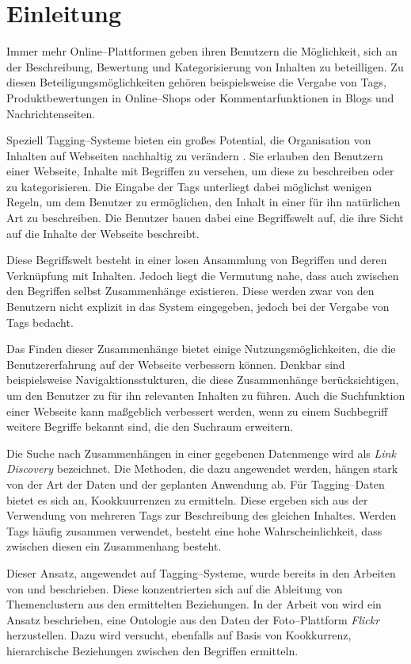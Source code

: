 \chapter{Einleitung}

Immer mehr Online--Plattformen geben ihren Benutzern die Möglichkeit, sich an der Beschreibung, Bewertung und Kategorisierung von Inhalten zu beteilligen. Zu diesen Beteiligungsmöglichkeiten gehören beispielsweise die Vergabe von Tags, Produktbewertungen in Online--Shops oder Kommentarfunktionen in Blogs und Nachrichtenseiten. 

Speziell Tagging--Systeme bieten ein großes Potential, die Organisation von Inhalten auf Webseiten nachhaltig zu verändern \cite{sc2005}. Sie erlauben den Benutzern einer Webseite, Inhalte mit Begriffen zu versehen, um diese zu beschreiben oder zu kategorisieren. Die Eingabe der Tags unterliegt dabei möglichst wenigen Regeln, um dem Benutzer zu ermöglichen, den Inhalt in einer für ihn natürlichen Art zu beschreiben. Die Benutzer bauen dabei eine Begriffswelt auf, die ihre Sicht auf die Inhalte der Webseite beschreibt.

Diese Begriffswelt besteht in einer losen Ansammlung von Begriffen und deren Verknüpfung mit Inhalten. Jedoch liegt die Vermutung nahe, dass auch zwischen den Begriffen selbst Zusammenhänge existieren. Diese werden zwar von den Benutzern nicht explizit in das System eingegeben, jedoch bei der Vergabe von Tags bedacht.

Das Finden dieser Zusammenhänge bietet einige Nutzungsmöglichkeiten, die die Benutzererfahrung auf der Webseite verbessern können. Denkbar sind beispielsweise Navigaktionsstukturen, die diese Zusammenhänge berücksichtigen, um den Benutzer zu für ihn relevanten Inhalten zu führen. Auch die Suchfunktion einer Webseite kann maßgeblich verbessert werden, wenn zu einem Suchbegriff weitere Begriffe bekannt sind, die den Suchraum erweitern.

Die Suche nach Zusammenhängen in einer gegebenen Datenmenge wird als \emph{Link Discovery} bezeichnet. Die Methoden, die dazu angewendet werden, hängen stark von der Art der Daten und der geplanten Anwendung ab. Für Tagging--Daten bietet es sich an, Kookkuurrenzen zu ermitteln. Diese ergeben sich aus der Verwendung von mehreren Tags zur Beschreibung des gleichen Inhaltes. Werden Tags häufig zusammen verwendet, besteht eine hohe Wahrscheinlichkeit, dass zwischen diesen ein Zusammenhang besteht. 

Dieser Ansatz, angewendet auf Tagging--Systeme, wurde bereits in den Arbeiten von \textcite{ps2006} und \textcite{kss2010} beschrieben. Diese konzentrierten sich auf die Ableitung von Themenclustern aus den ermittelten Beziehungen. In der Arbeit von \textcite{ps2006} wird ein Ansatz beschrieben, eine Ontologie aus den Daten der Foto--Plattform \emph{Flickr} herzustellen. Dazu wird versucht, ebenfalls auf Basis von Kookkurrenz, hierarchische Beziehungen zwischen den Begriffen ermitteln.

